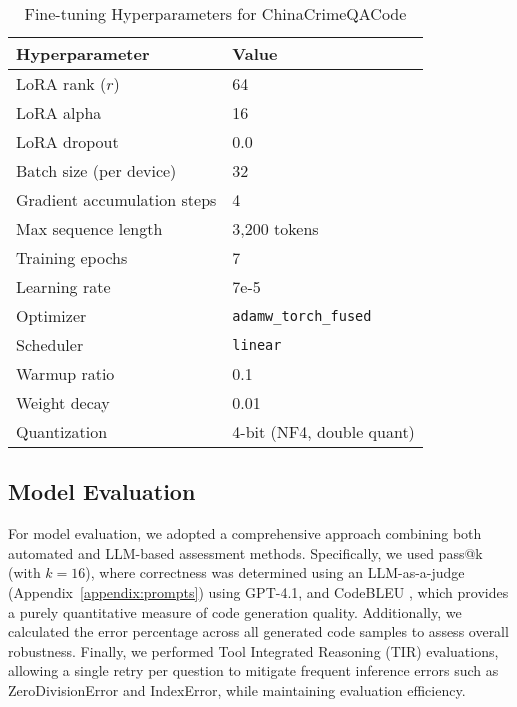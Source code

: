 \begin{table}[H]
\centering
\caption{Fine-tuning Hyperparameters for ChinaCrimeQACode}
\label{tab:hyperparameters}
\begin{tabular}{ll}
\toprule
\textbf{Hyperparameter} & \textbf{Value} \\
\midrule
LoRA rank ($r$) & 64 \\
LoRA alpha & 16 \\
LoRA dropout & 0.0 \\
Batch size (per device) & 32 \\
Gradient accumulation steps & 4 \\
Max sequence length & 3,200 tokens \\
Training epochs & 7 \\
Learning rate & 7e-5 \\
Optimizer & \texttt{adamw\_torch\_fused} \\
Scheduler & \texttt{linear} \\
Warmup ratio & 0.1 \\
Weight decay & 0.01 \\
Quantization & 4-bit (NF4, double quant) \\
\bottomrule
\end{tabular}
\end{table}


\subsection{Model Evaluation}

For model evaluation, we adopted a comprehensive approach combining both automated and LLM-based assessment methods. Specifically, we used pass@k \cite{Levi2024SimpleModelInferenceScalingLaws} (with $k=16$), where correctness was determined using an LLM-as-a-judge \cite{Li2025LLMJudge} (Appendix~\ref{appendix:prompts}) using GPT-4.1, and CodeBLEU \cite{Ren2020CodeBLEU}, which provides a purely quantitative measure of code generation quality. Additionally, we calculated the error percentage across all generated code samples to assess overall robustness. Finally, we performed Tool Integrated Reasoning (TIR) \cite{Fleureau2024NuminaMath} evaluations, allowing a single retry per question to mitigate frequent inference errors such as ZeroDivisionError and IndexError, while maintaining evaluation efficiency.

